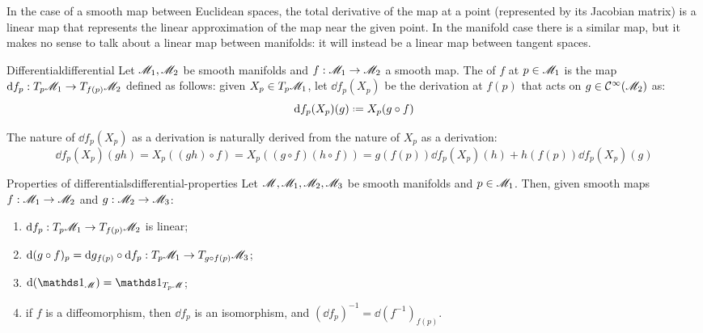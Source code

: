 In the case of a smooth map between Euclidean spaces, the total derivative of the map at a point (represented by its Jacobian matrix) is a linear map that represents the linear approximation of the map near the given point. In the manifold case there is a similar map, but it makes no sense to talk about a linear map between manifolds: it will instead be a linear map between tangent spaces.

\begin{definition}{Differential}{differential}
  Let $ \mathscr{M}_1 , \mathscr{M}_2 $ be smooth manifolds and $ f : \mathscr{M}_1 \rightarrow \mathscr{M}_2 $ a smooth map. The  of $ f $ at $ p \in \mathscr{M}_1 $ is the map $ \mathrm{d} f_p : T_p\mathscr{M}_1 \rightarrow T_{f(p)}\mathscr{M}_2 $ defined as follows: given $ X_p \in T_p\mathscr{M}_1 $, let $ \dd f_p(X_p) $ be the derivation at $ f(p) $ that acts on $ g \in \mathcal{C}^{\infty}(\mathscr{M}_2) $ as:
  \begin{equation}
    \dd f_p(X_p)(g) \defeq X_p(g \circ f)
    \label{eq:differential-def}
  \end{equation}
\end{definition}

The nature of $ \dd f_p(X_p) $ as a derivation is naturally derived from the nature of $ X_p $ as a derivation:
\begin{equation*}
  \dd f_p(X_p)(gh) = X_p((gh) \circ f) = X_p((g \circ f) (h \circ f)) = g(f(p)) \dd f_p(X_p)(h) + h(f(p)) \dd f_p(X_p)(g)
\end{equation*}

\begin{lemma}{Properties of differentials}{differential-properties}
  Let $ \mathscr{M} , \mathscr{M}_1 , \mathscr{M}_2 , \mathscr{M}_3 $ be smooth manifolds and $ p \in \mathscr{M}_1 $. Then, given smooth maps $ f : \mathscr{M}_1 \rightarrow \mathscr{M}_2 $ and $ g : \mathscr{M}_2 \rightarrow \mathscr{M}_3 $:
  \begin{enumerate}
    \item \label{item:diff-1} $ \mathrm{d} f_p : T_p\mathscr{M}_1 \rightarrow T_{f(p)}\mathscr{M}_2 $ is linear;
    \item \label{item:diff-2} $ \mathrm{d} (g \circ f)_p = \mathrm{d} g_{f(p)} \circ \mathrm{d} f_p : T_p\mathscr{M}_1 \rightarrow T_{g \circ f(p)}\mathscr{M}_3 $;
    \item \label{item:diff-3} $ \dd (\id_\man) = \id_{T_p\man} $;
    \item \label{item:diff-4} if $ f $ is a diffeomorphism, then $ \dd f_p $ is an isomorphism, and $ (\dd f_p)^{-1} = \dd (f^{-1})_{f(p)} $.
  \end{enumerate}
\end{lemma}

